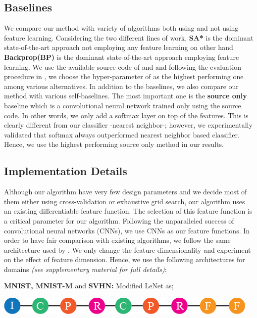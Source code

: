 \subsection{Baselines}
We compare our method with variety of algorithms both using and not using feature learning. Considering the two different lines of work, \textbf{SA*}\cite{fernando13} is the dominant state-of-the-art approach not employing any feature learning on other hand \textbf{Backprop(BP)}\cite{ganin15} is the dominant state-of-the-art approach employing feature learning. We use the available source code of \cite{ganin15} and \cite{fernando13} and following the evaluation procedure in \cite{fernando13}, we choose the hyper-parameter of \cite{fernando13} as the highest performing one among various alternatives. In addition to the baselines, we also compare our method with various self-baselines. The most important one is the \textbf{source only} baseline which is a convolutional neural network trained only using the source code. In other words, we only add a softmax layer on top of the features. This is clearly different from our classifier -nearest neighbor-; however, we experimentally validated that softmax always outperformed nearest neighbor based classifier. Hence, we use the highest performing source only method in our results.

\subsection{Implementation Details}
Although our algorithm have very few design parameters and we decide most of them either using cross-validation or exhaustive grid search, our algorithm uses an existing differentiable feature function. The selection of this feature function is a critical parameter for our algorithm. Following the unparalleled success of convolutional neural networks (CNNs), we use CNNs as our feature functions.  In order to have  fair comparison with existing algorithms, we follow the same architecture used by \cite{ganin15}. We only change the feature dimensionality and experiment on the effect of feature dimension. Hence, we use the following architectures for domains \emph{(see supplementary material for full details)}:

\noindent \textbf{MNIST, MNIST-M} and \textbf{SVHN:} Modified LeNet\cite{lenet} as;

\includegraphics[width=\columnwidth]{lenet}


